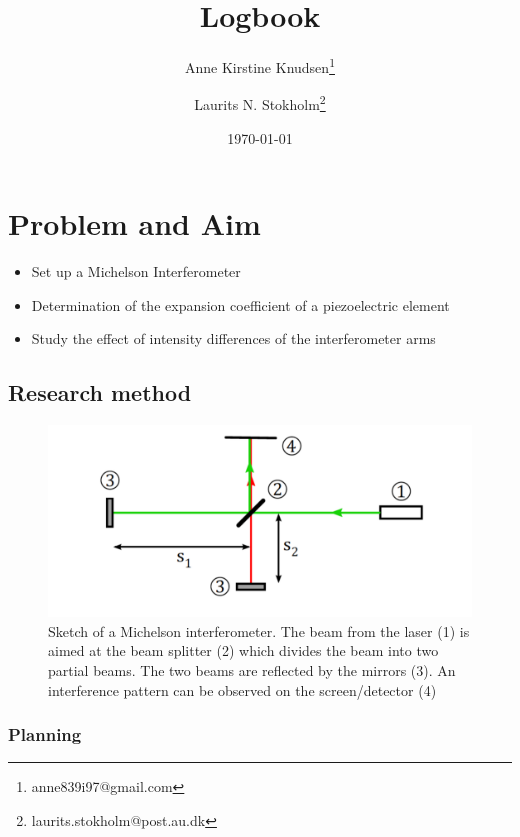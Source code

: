 \documentclass[a4paper, oneside, onecolumn, 11pt]{memoir}
\title{Logbook}
\author{Anne Kirstine Knudsen\thanks{anne839i97@gmail.com} \and Laurits N. Stokholm\thanks{laurits.stokholm@post.au.dk}}
\date{\today}
\begin{document}
\maketitle

\section{Problem and Aim}
\begin{itemize}
    \item Set up a Michelson Interferometer
    \item Determination of the expansion coefficient of a piezoelectric element
    \item Study the effect of intensity differences of the interferometer arms
\end{itemize}


\subsection{Research method}
\begin{figure}[h!]
    \centering
    \includegraphics[width=\columnwidth]{michelsonsetup}
        \caption{Sketch of a Michelson interferometer. The beam from the laser (1) is aimed at the beam splitter (2) which divides the beam into two partial beams. The two beams are reflected by the mirrors (3). An interference pattern can be observed on the screen/detector (4)}
    \label{fig:michelsonsetup}
\end{figure}

\subsubsection{Planning}
\end{document}
